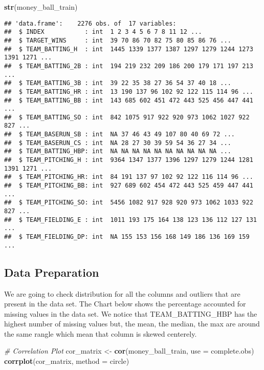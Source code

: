 \documentclass[
]{article}
\newenvironment{Shaded}{\begin{snugshade}}{\end{snugshade}}
\newcommand{\AttributeTok}[1]{\textcolor[rgb]{0.13,0.29,0.53}{#1}}
\newcommand{\CommentTok}[1]{\textcolor[rgb]{0.56,0.35,0.01}{\textit{#1}}}
\newcommand{\FunctionTok}[1]{\textcolor[rgb]{0.13,0.29,0.53}{\textbf{#1}}}
\newcommand{\NormalTok}[1]{#1}
\newcommand{\OtherTok}[1]{\textcolor[rgb]{0.56,0.35,0.01}{#1}}
\newcommand{\StringTok}[1]{\textcolor[rgb]{0.31,0.60,0.02}{#1}}
\begin{document}
\begin{Shaded}
\begin{Highlighting}[]
\FunctionTok{str}\NormalTok{(money\_ball\_train)}
\end{Highlighting}
\end{Shaded}

\begin{verbatim}
## 'data.frame':    2276 obs. of  17 variables:
##  $ INDEX           : int  1 2 3 4 5 6 7 8 11 12 ...
##  $ TARGET_WINS     : int  39 70 86 70 82 75 80 85 86 76 ...
##  $ TEAM_BATTING_H  : int  1445 1339 1377 1387 1297 1279 1244 1273 1391 1271 ...
##  $ TEAM_BATTING_2B : int  194 219 232 209 186 200 179 171 197 213 ...
##  $ TEAM_BATTING_3B : int  39 22 35 38 27 36 54 37 40 18 ...
##  $ TEAM_BATTING_HR : int  13 190 137 96 102 92 122 115 114 96 ...
##  $ TEAM_BATTING_BB : int  143 685 602 451 472 443 525 456 447 441 ...
##  $ TEAM_BATTING_SO : int  842 1075 917 922 920 973 1062 1027 922 827 ...
##  $ TEAM_BASERUN_SB : int  NA 37 46 43 49 107 80 40 69 72 ...
##  $ TEAM_BASERUN_CS : int  NA 28 27 30 39 59 54 36 27 34 ...
##  $ TEAM_BATTING_HBP: int  NA NA NA NA NA NA NA NA NA NA ...
##  $ TEAM_PITCHING_H : int  9364 1347 1377 1396 1297 1279 1244 1281 1391 1271 ...
##  $ TEAM_PITCHING_HR: int  84 191 137 97 102 92 122 116 114 96 ...
##  $ TEAM_PITCHING_BB: int  927 689 602 454 472 443 525 459 447 441 ...
##  $ TEAM_PITCHING_SO: int  5456 1082 917 928 920 973 1062 1033 922 827 ...
##  $ TEAM_FIELDING_E : int  1011 193 175 164 138 123 136 112 127 131 ...
##  $ TEAM_FIELDING_DP: int  NA 155 153 156 168 149 186 136 169 159 ...
\end{verbatim}

\hypertarget{data-preparation}{%
\subsection{Data Preparation}\label{data-preparation}}

We are going to check distribution for all the columns and outliers that
are present in the data set. The Chart below shows the percentage
accounted for missing values in the data set. We notice that
TEAM\_BATTING\_HBP has the highest number of missing values but, the
mean, the median, the max are around the same rangle which mean that
column is skewed centerely.

\begin{Shaded}
\begin{Highlighting}[]
\CommentTok{\# Correlation Plot}
\NormalTok{cor\_matrix }\OtherTok{\textless{}{-}} \FunctionTok{cor}\NormalTok{(money\_ball\_train, }\AttributeTok{use =} \StringTok{\textquotesingle{}complete.obs\textquotesingle{}}\NormalTok{)}
\FunctionTok{corrplot}\NormalTok{(cor\_matrix, }\AttributeTok{method =} \StringTok{\textquotesingle{}circle\textquotesingle{}}\NormalTok{)}
\end{Highlighting}
\end{Shaded}
\end{document}

